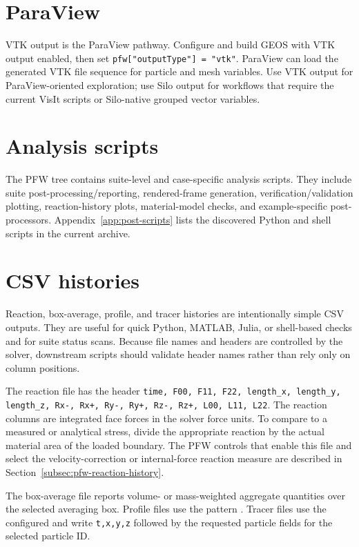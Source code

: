 \section{ParaView}
VTK output is the ParaView pathway.  Configure and build GEOS with VTK output enabled, then set \texttt{pfw["outputType"] = "vtk"}.  ParaView can load the generated VTK file sequence for particle and mesh variables.  Use VTK output for ParaView-oriented exploration; use Silo output for workflows that require the current VisIt scripts or Silo-native grouped vector variables.

\section{Analysis scripts}
The PFW tree contains suite-level and case-specific analysis scripts.  They include suite post-processing/reporting, rendered-frame generation, verification/validation plotting, reaction-history plots, material-model checks, and example-specific post-processors.  Appendix~\ref{app:post-scripts} lists the discovered Python and shell scripts in the current archive.

\section{CSV histories}
\label{sec:csv-histories}
Reaction, box-average, profile, and tracer histories are intentionally simple CSV outputs.  They are useful for quick Python, MATLAB, Julia, or shell-based checks and for suite status scans.  Because file names and headers are controlled by the solver, downstream scripts should validate header names rather than rely only on column positions.

The reaction file  has the header \texttt{time, F00, F11, F22, length\_x, length\_y, length\_z, Rx-, Rx+, Ry-, Ry+, Rz-, Rz+, L00, L11, L22}.  The reaction columns are integrated face forces in the solver force units.  To compare to a measured or analytical stress, divide the appropriate reaction by the actual material area of the loaded boundary.  The PFW controls that enable this file and select the velocity-correction or internal-force reaction measure are described in Section~\ref{subsec:pfw-reaction-history}.

The box-average file  reports volume- or mass-weighted aggregate quantities over the selected averaging box.  Profile files use the pattern .  Tracer files use the configured  and write \texttt{t,x,y,z} followed by the requested particle fields for the selected particle ID.


